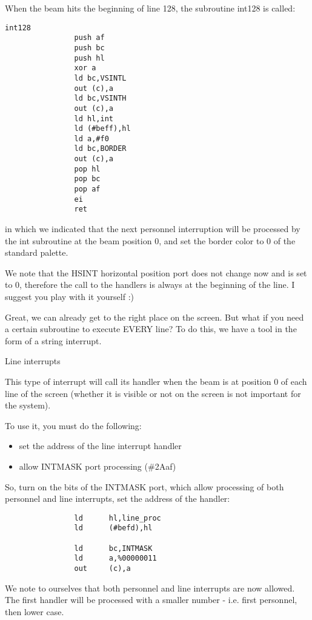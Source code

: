 When the beam hits the beginning of line 128, the subroutine int128 is
called:
\begin{verbatim}
int128
                push af
                push bc
                push hl
                xor a
                ld bc,VSINTL
                out (c),a
                ld bc,VSINTH
                out (c),a
                ld hl,int
                ld (#beff),hl
                ld a,#f0
                ld bc,BORDER
                out (c),a
                pop hl
                pop bc
                pop af
                ei
                ret
\end{verbatim}
in which we indicated that the next personnel interruption will be
processed by the int subroutine at the beam position 0, and set the
border color to 0 of the standard palette.

We note that the HSINT horizontal position port does not change now
and is set to 0, therefore the call to the handlers is always at the
beginning of the line. I suggest you play with it yourself :)

Great, we can already get to the right place on the screen. But what
if you need a certain subroutine to execute EVERY line?  To do this,
we have a tool in the form of a string interrupt.

Line interrupts

This type of interrupt will call its handler when the beam is at
position 0 of each line of the screen (whether it is visible or not on
the screen is not important for the system).

To use it, you must do the following:
\begin{itemize}
\item set the address of the line interrupt handler
\item allow INTMASK port processing (\#2Aaf)
\end{itemize}
So, turn on the bits of the INTMASK port, which allow processing of
both personnel and line interrupts, set the address of the handler:
\begin{verbatim}
                ld      hl,line_proc
                ld      (#befd),hl

                ld      bc,INTMASK
                ld      a,%00000011
                out     (c),a
\end{verbatim}
We note to ourselves that both personnel and line interrupts are now
allowed.  The first handler will be processed with a smaller number -
i.e. first personnel, then lower case.

